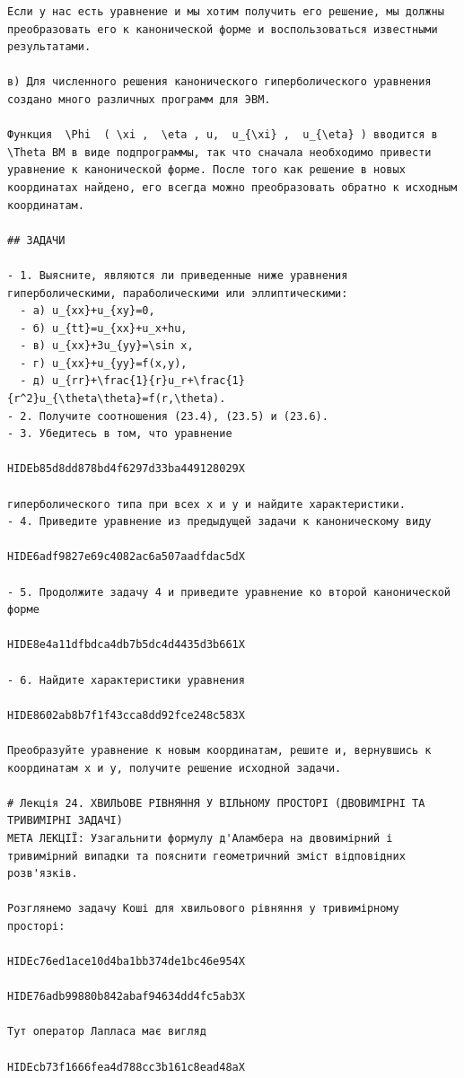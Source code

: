 \documentclass[
  ukrainian,
]{article}
\begin{document}
\begin{verbatim}
Если у нас есть уравнение и мы хотим получить его решение, мы должны преобразовать его к канонической форме и воспользоваться известными результатами.

в) Для численного решения канонического гиперболического уравнения создано много различных программ для ЭВМ.

Функция  \Phi  ( \xi ,  \eta , u,  u_{\xi} ,  u_{\eta} ) вводится в  \Theta ВМ в виде подпрограммы, так что сначала необходимо привести уравнение к канонической форме. После того как решение в новых координатах найдено, его всегда можно преобразовать обратно к исходным координатам.

## ЗАДАЧИ

- 1. Выясните, являются ли приведенные ниже уравнения гиперболическими, параболическими или эллиптическими:
  - a) u_{xx}+u_{xy}=0,
  - б) u_{tt}=u_{xx}+u_x+hu,
  - в) u_{xx}+3u_{yy}=\sin x,
  - г) u_{xx}+u_{yy}=f(x,y),
  - д) u_{rr}+\frac{1}{r}u_r+\frac{1}{r^2}u_{\theta\theta}=f(r,\theta).
- 2. Получите соотношения (23.4), (23.5) и (23.6).
- 3. Убедитесь в том, что уравнение

HIDEb85d8dd878bd4f6297d33ba449128029X

гиперболического типа при всех x и y и найдите характеристики.
- 4. Приведите уравнение из предыдущей задачи к каноническому виду

HIDE6adf9827e69c4082ac6a507aadfdac5dX

- 5. Продолжите задачу 4 и приведите уравнение ко второй канонической форме

HIDE8e4a11dfbdca4db7b5dc4d4435d3b661X

- 6. Найдите характеристики уравнения

HIDE8602ab8b7f1f43cca8dd92fce248c583X

Преобразуйте уравнение к новым координатам, решите и, вернувшись к координатам x и y, получите решение исходной задачи.

# Лекція 24. ХВИЛЬОВЕ РІВНЯННЯ У ВІЛЬНОМУ ПРОСТОРІ (ДВОВИМІРНІ ТА ТРИВИМІРНІ ЗАДАЧІ)
МЕТА ЛЕКЦІЇ: Узагальнити формулу д'Аламбера на двовимірний і тривимірний випадки та пояснити геометричний зміст відповідних розв'язків.

Розглянемо задачу Коші для хвильового рівняння у тривимірному просторі:

HIDEc76ed1ace10d4ba1bb374de1bc46e954X

HIDE76adb99880b842abaf94634dd4fc5ab3X

Тут оператор Лапласа має вигляд

HIDEcb73f1666fea4d788cc3b161c8ead48aX


\end{verbatim}
\end{document}
